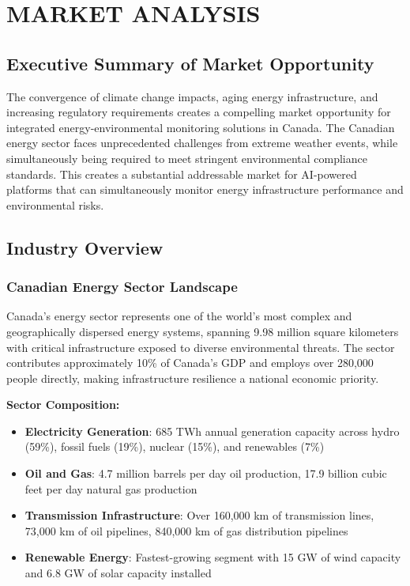 \section{MARKET ANALYSIS}

\subsection{Executive Summary of Market Opportunity}

The convergence of climate change impacts, aging energy infrastructure, and increasing regulatory requirements creates a compelling market opportunity for integrated energy-environmental monitoring solutions in Canada. The Canadian energy sector faces unprecedented challenges from extreme weather events, while simultaneously being required to meet stringent environmental compliance standards. This creates a substantial addressable market for AI-powered platforms that can simultaneously monitor energy infrastructure performance and environmental risks.

\subsection{Industry Overview}

\subsubsection{Canadian Energy Sector Landscape}

Canada's energy sector represents one of the world's most complex and geographically dispersed energy systems, spanning 9.98 million square kilometers with critical infrastructure exposed to diverse environmental threats. The sector contributes approximately 10\% of Canada's GDP and employs over 280,000 people directly, making infrastructure resilience a national economic priority.

\textbf{Sector Composition:}
\begin{itemize}
    \item \textbf{Electricity Generation}: 685 TWh annual generation capacity across hydro (59\%), fossil fuels (19\%), nuclear (15\%), and renewables (7\%)
    \item \textbf{Oil and Gas}: 4.7 million barrels per day oil production, 17.9 billion cubic feet per day natural gas production
    \item \textbf{Transmission Infrastructure}: Over 160,000 km of transmission lines, 73,000 km of oil pipelines, 840,000 km of gas distribution pipelines
    \item \textbf{Renewable Energy}: Fastest-growing segment with 15 GW of wind capacity and 6.8 GW of solar capacity installed
\end{itemize}


